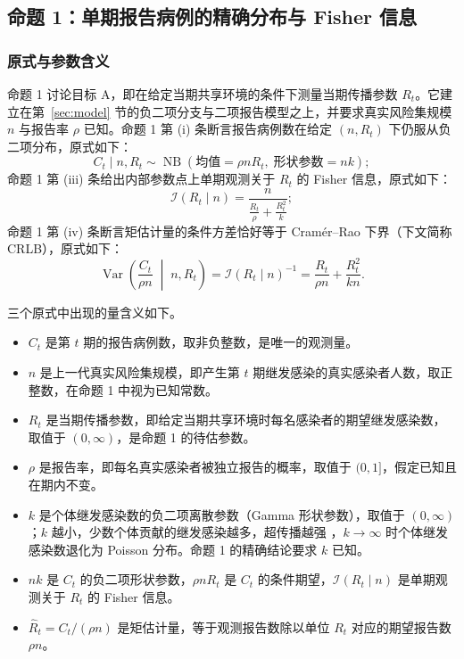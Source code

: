 \subsection{命题 1：单期报告病例的精确分布与 Fisher 信息}

\subsubsection{原式与参数含义}

命题 1 讨论目标 A，即在给定当期共享环境的条件下测量当期传播参数 $R_t$。它建立在第~\ref{sec:model} 节的负二项分支与二项报告模型之上，并要求真实风险集规模 $n$ 与报告率 $\rho$ 已知。命题 1 第 (i) 条断言报告病例数在给定 $(n,R_t)$ 下仍服从负二项分布，原式如下：
\begin{equation*}
C_t \mid n, R_t \sim \operatorname{NB}\!\left(\text{均值} = \rho n R_t, \; \text{形状参数} = nk\right);
\tag{原文式 4}
\end{equation*}
命题 1 第 (iii) 条给出内部参数点上单期观测关于 $R_t$ 的 Fisher 信息，原式如下：
\begin{equation*}
\mathcal{I}(R_t \mid n) = \frac{n}{\frac{R_t}{\rho} + \frac{R_t^2}{k}};
\tag{原文式 5}
\end{equation*}
命题 1 第 (iv) 条断言矩估计量的条件方差恰好等于 Cramér--Rao 下界（下文简称 CRLB），原式如下：
\begin{equation*}
\operatorname{Var}\!\left(\frac{C_t}{\rho n} \;\middle|\; n, R_t\right) = \mathcal{I}(R_t \mid n)^{-1} = \frac{R_t}{\rho n} + \frac{R_t^2}{k n}.
\tag{原文式 6}
\end{equation*}

三个原式中出现的量含义如下。
\begin{itemize}
\item $C_t$ 是第 $t$ 期的报告病例数，取非负整数，是唯一的观测量。
\item $n$ 是上一代真实风险集规模，即产生第 $t$ 期继发感染的真实感染者人数，取正整数，在命题 1 中视为已知常数。
\item $R_t$ 是当期传播参数，即给定当期共享环境时每名感染者的期望继发感染数，取值于 $(0,\infty)$，是命题 1 的待估参数。
\item $\rho$ 是报告率，即每名真实感染者被独立报告的概率，取值于 $(0,1]$，假定已知且在期内不变。
\item $k$ 是个体继发感染数的负二项离散参数（Gamma 形状参数），取值于 $(0,\infty)$；$k$ 越小，少数个体贡献的继发感染越多，超传播越强 \citep{lloydsmith2005superspreading}，$k\to\infty$ 时个体继发感染数退化为 Poisson 分布。命题 1 的精确结论要求 $k$ 已知。
\item $nk$ 是 $C_t$ 的负二项形状参数，$\rho nR_t$ 是 $C_t$ 的条件期望，$\mathcal{I}(R_t\mid n)$ 是单期观测关于 $R_t$ 的 Fisher 信息。
\item $\widehat{R}_t=C_t/(\rho n)$ 是矩估计量，等于观测报告数除以单位 $R_t$ 对应的期望报告数 $\rho n$。
\end{itemize}

